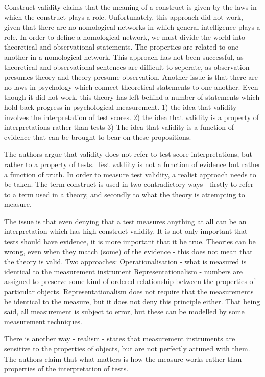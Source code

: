 Construct validity claims that the meaning of a construct is given by the laws in which the construct plays a role. Unfortunately, this approach did not work, given that there are no nomological networks in which general intelligence plays a role.
In order to define a nomological network, we must divide the world into theoretical and observational statements.
The properties are related to one another in a nomological network.
This approach has not been successful, as theoretical and observational sentences are difficult to seperate, as observation presumes theory and theory presume observation. 
Another issue is that there are no laws in psychology which connect theoretical statements to one another. Even though it did not work, this theory has left behind a number of statements which hold back progress in psychological measurement.
1) the idea that validity involves the interpretation of test scores.
2) the idea that validity is a property of interpretations rather than tests
3) The idea that validity is a function of evidence that can be brought to bear on these propositions.

The authors argue that validity does not refer to test score interpretations, but rather to a property of tests.
Test valdiity is not a function of evidence but rather a function of truth.
In order to measure test validity, a realist approach needs to be taken.
The term construct is used in two contradictory ways - firstly to refer to a term used in a theory, and secondly to what the theory is attempting to measure. 

The issue is that even denying that a test measures anything at all can be an interpretation which has high construct validity.
It is not only important that tests should have evidence, it is more important that it be true.
Theories can be wrong, even when they match (some) of the evidence - this does not mean that the theory is valid.
Two approaches:
Operationalisation - what is measured is identical to the measurement instrument
Representationalism - numbers are assigned to preserve some kind of ordered relationship between the properties of particular objects.
Representationalism does not require that the measurements be identical to the measure, but it does not deny this principle either.
That being said, all measurement is subject to error, but these can be modelled by some measurement techniques. 

There is another way - realism - states that measurement instruments are sensitive to the properties of objects, but are not perfectly attuned with them. The authors claim that what matters is how the measure works rather than properties of the interpretation of tests.

